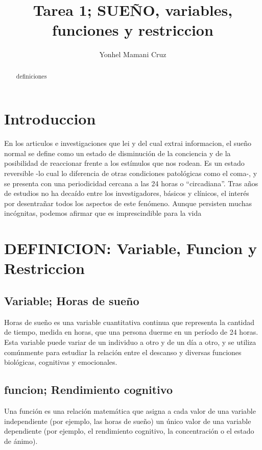 \documentclass{article}
\title{Tarea 1; SUEÑO, variables, funciones y restriccion}
\author{Yonhel Mamani Cruz}
\begin{document}
\maketitle

\begin{abstract}
definiciones
\end{abstract}

\section{Introduccion}

En los articulos e investigaciones que lei y del cual extrai informacion, el sueño normal se define como un estado de disminución de la conciencia y de la posibilidad de reaccionar frente a los estímulos que nos rodean. Es un estado reversible -lo cual lo diferencia de otras condiciones patológicas como el coma-, y se presenta con una periodicidad cercana a las 24 horas o “circadiana”. Tras años de estudios no ha decaído entre los investigadores, básicos y clínicos, el interés por desentrañar todos los aspectos de este fenómeno. Aunque persisten muchas incógnitas, podemos afirmar que es imprescindible para la vida

\section{DEFINICION: Variable, Funcion y Restriccion}

\subsection{Variable; Horas de sueño}

Horas de sueño es una variable cuantitativa continua que representa la cantidad de tiempo, medida en horas, que una persona duerme en un período de 24 horas. Esta variable puede variar de un individuo a otro y de un día a otro, y se utiliza comúnmente para estudiar la relación entre el descanso y diversas funciones biológicas, cognitivas y emocionales.

\subsection{funcion; Rendimiento cognitivo}

Una función es una relación matemática que asigna a cada valor de una variable independiente (por ejemplo, las horas de sueño) un único valor de una variable dependiente (por ejemplo, el rendimiento cognitivo, la concentración o el estado de ánimo).
\end{document}

